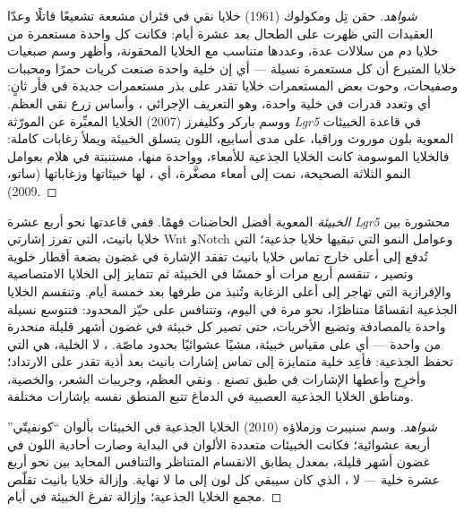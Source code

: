 \begin{proof}[شواهد]
حقن تِل ومكولوك (1961) خلايا نقي في فئران مشععة تشعيعًا
قاتلًا وعدّا العقيدات التي ظهرت على الطحال بعد عشرة أيام:
فكانت كل واحدة مستعمرة من خلايا دم من سلالات عدة، وعددها
متناسب مع الخلايا المحقونة، وأظهر وسم صبغيات خلايا المتبرع
أن كل مستعمرة نسيلة --- أي إن خلية واحدة صنعت كريات حمرًا
ومحببات وصفيحات، وحوت بعض المستعمرات خلايا تقدر على بذر
مستعمرات جديدة في فأر ثانٍ: أي  وتعدد قدرات في
خلية واحدة، وهو التعريف الإجرائي ، وأساس زرع
نقي العظم. ووسم باركر وكليفرز (2007) الخلايا المعبِّرة عن
المورّثة \emph{Lgr5} في قاعدة الخبيئات المعوية بلون موروث
وراقبا، على مدى أسابيع، اللون يتسلق الخبيئة ويملأ زغابات
كاملة: فالخلايا الموسومة كانت الخلايا الجذعية للأمعاء،
وواحدة منها، مستنبتة في هلام بعوامل النمو الثلاثة الصحيحة،
نمت إلى أمعاء مصغَّرة، أي \emph{}، لها خبيئاتها
وزغاباتها (ساتو، 2009).
\end{proof}

\begin{proposition}\label{prop:b3:stem-cells:crypt}
\emph{الخبيئة} المعوية أفضل الحاضنات فهمًا. ففي قاعدتها نحو
أربع عشرة  \emph{Lgr5} محشورة بين خلايا بانيث،
التي تفرز إشارتي Wnt وNotch وعوامل النمو التي تبقيها خلايا
جذعية؛  التي تُدفع إلى أعلى خارج تماس خلايا
بانيث تفقد الإشارة في غضون بضعة أقطار خلوية وتصير ، تنقسم أربع مرات أو خمسًا في الخبيئة ثم تتمايز إلى
الخلايا الامتصاصية والإفرازية التي تهاجر إلى أعلى الزغابة
وتُنبذ من طرفها بعد خمسة أيام. وتنقسم الخلايا الجذعية
انقسامًا متناظرًا، نحو مرة في اليوم، وتتنافس على حيّز
 المحدود: فتتوسع نسيلة واحدة بالمصادفة وتضيع الأخريات،
حتى تصير كل خبيئة في غضون أشهر قليلة منحدرة من 
واحدة --- أي \emph{} على مقياس خبيئة، مشيًا
عشوائيًا بحدود ماصّة. ، لا الخلية، هي التي تحفظ
الجذعية: فأعِد خلية متمايزة إلى تماس إشارات بانيث بعد أذية
تقدر على الارتداد؛ وأخرِج  وأعطها الإشارات في
طبق تصنع . ونقي العظم، وجريبات الشعر، والخصية،
ومناطق الخلايا الجذعية العصبية في الدماغ تتبع المنطق نفسه
بإشارات مختلفة.
\end{proposition}
\begin{proof}[شواهد]
وسم سنيبرت وزملاؤه (2010) الخلايا الجذعية في الخبيئات
بألوان ``كونفيتّي'' أربعة عشوائية؛ فكانت الخبيئات متعددة
الألوان في البداية وصارت أحادية اللون في غضون أشهر قليلة،
بمعدل يطابق الانقسام المتناظر والتنافس المحايد بين نحو أربع
عشرة خلية --- لا ، الذي كان سيبقي كل لون
إلى ما لا نهاية. وإزالة خلايا بانيث تقلّص مجمع الخلايا
الجذعية؛ وإزالة  تفرغ الخبيئة في أيام.
\end{proof}

